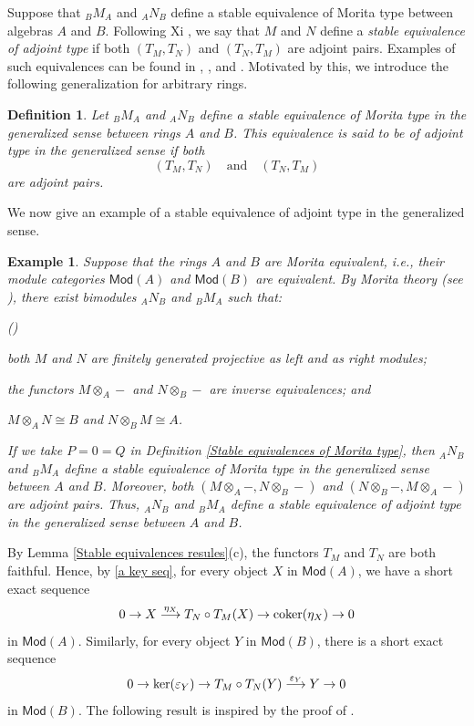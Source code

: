 \documentclass[12pt,twoside]{amsart}
\theoremstyle{bfupright head,slanted body}
\theoremstyle{bfupright head,upright body}
\theoremstyle{fixed bf head,slanted body}
\theoremstyle{fixed bf head,upright body}
\newtheorem{dfn}[res]{Definition}       \newtheorem*{dfn*}{Definition}
\newtheorem{exa}[res]{Example}           \newtheorem*{exa*}{Example}
\theoremstyle{numbered paragraph}
\newlength{\thmlistleft}        %
\newlength{\thmlistright}       %
\newlength{\thmlistpartopsep}   %
\newlength{\thmlisttopsep}      %
\newlength{\thmlistparsep}      %
\newlength{\thmlistitemsep}     %
\newcounter{eqc}
\newenvironment{eqc}{\begin{list}{\upshape (\textit{\roman{eqc}})}%
    {\usecounter{eqc}%
      \setlength{\leftmargin}{\thmlistleft}%
      \setlength{\labelwidth}{\thmlistleft}%
      \setlength{\rightmargin}{\thmlistright}%
      \setlength{\partopsep}{\thmlistpartopsep}%
      \setlength{\topsep}{\thmlisttopsep}%
      \setlength{\parsep}{\thmlistparsep}%
      \setlength{\itemsep}{\thmlistitemsep}}}%
  {\end{list}}%
\newcommand{\prpcite}[2][?]{\cite[Proposition~#1]{#2}}
\newcommand{\dfncite}[2][?]{\cite[Definition~#1]{#2}}
\numberwithin{equation}{res}
\newcommand{\coker}{\mbox{\rm coker}}
\newcommand{\Mod}{\mathsf{Mod}}
\newcommand{\kernel}{\mbox{\rm ker}}
\begin{document}
Suppose that \({}_BM_A\) and \({}_AN_B\) define a stable equivalence of Morita type between algebras \(A\) and \(B\). Following Xi \dfncite[3.2]{2008Xi}, we say that \(M\) and \(N\) define a \emph{stable equivalence of adjoint type} if both \((T_M,T_N)\) and \((T_N,T_M)\) are adjoint pairs. Examples of such equivalences can be found in \cite{2008Xi}, \cite{LX2007}, and \cite{DM2007}. Motivated by this, we introduce the following generalization for arbitrary rings.

\begin{dfn} \label{Stable equivalences of adjoints}
Let \({}_BM_A\) and \({}_AN_B\) define a stable equivalence of Morita type in the generalized sense between rings \(A\) and \(B\).
This equivalence is said to be of \emph{adjoint type in the generalized sense} if both
\[
(T_M,T_N) \quad\text{and}\quad (T_N,T_M)
\]
are adjoint pairs.
\end{dfn}

We now give an example of a stable equivalence of adjoint type in the generalized sense.

\begin{exa} \label{examples of adjoint type}
Suppose that the rings \(A\) and \(B\) are Morita equivalent, i.e., their module categories \(\Mod(A)\) and \(\Mod(B)\) are equivalent. By Morita theory (see \cite{1992AF}), there exist bimodules \({}_AN_B\) and \({}_BM_A\) such that:
\begin{eqc}
\item[\(\bullet\)] both \(M\) and \(N\) are finitely generated projective as left and as right modules;
\item[\(\bullet\)] the functors \(M\otimes_A-\) and \(N\otimes_B-\) are inverse equivalences; and
\item[\(\bullet\)] \(M\otimes_A N\cong B\) and \(N\otimes_B M\cong A\).
\end{eqc}
If we take \(P=0=Q\) in Definition \ref{Stable equivalences of Morita type}, then \({}_AN_B\) and \({}_BM_A\) define a stable equivalence of Morita type in the generalized sense between \(A\) and \(B\). Moreover, both \((M\otimes_A-,N\otimes_B-)\) and \((N\otimes_B-,M\otimes_A-)\) are adjoint pairs. Thus, \({}_AN_B\) and \({}_BM_A\) define a stable equivalence of adjoint type in the generalized sense between \(A\) and \(B\).
\end{exa}

By Lemma \ref{Stable equivalences resules}(c), the functors $T_M$ and $T_N$ are both faithful.
Hence, by \ref{a key seq}, for every object $X$ in $\Mod(A)$, we have a short exact sequence
\[
0  \to  X  \overset{\eta_X}  \longrightarrow  T_N\circ T_M(X)  \to  \coker(\eta_X)  \to  0
\]
in $\Mod(A)$.
Similarly, for every object $Y$ in $\Mod(B)$, there is a short exact sequence
\[
0 \to \kernel(\varepsilon_Y) \to  T_M\circ T_N(Y)  \overset{\varepsilon_Y} \longrightarrow Y \to 0
\]
in $\Mod(B)$.
The following result is inspired by the proof of \prpcite[5.4]{2022Ren}.
\end{document}
